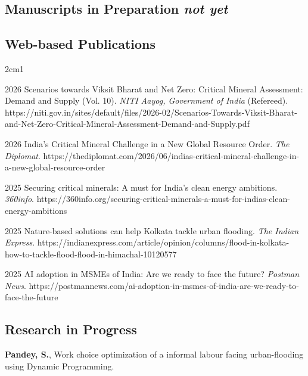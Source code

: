 \documentclass[final, 12pt]{article}
\begin{document}
\subsection*{Manuscripts in Preparation \it not yet}




\subsection*{Web-based Publications}

\begin{hangparas}{2cm}{1}

2026 \tabto{2cm} Scenarios towards Viksit Bharat and Net Zero: Critical Mineral Assessment: Demand and Supply (Vol. 10). {\it NITI Aayog, Government of India} (Refereed). https://niti.gov.in/sites/default/files/2026-02/Scenarios-Towards-Viksit-Bharat-and-Net-Zero-Critical-Mineral-Assessment-Demand-and-Supply.pdf 

2026 \tabto{2cm} India’s Critical Mineral Challenge in a New Global Resource Order. {\it The Diplomat}. https://thediplomat.com/2026/06/indias-critical-mineral-challenge-in-a-new-global-resource-order

2025 \tabto{2cm} Securing critical minerals: A must for India’s clean energy ambitions. {\it 360info}. https://360info.org/securing-critical-minerals-a-must-for-indias-clean-energy-ambitions

2025 \tabto{2cm} Nature-based solutions can help Kolkata tackle urban flooding. {\it The Indian Express}. https://indianexpress.com/article/opinion/columns/flood-in-kolkata-how-to-tackle-flood-flood-in-himachal-10120577 

2025 \tabto{2cm} AI adoption in MSMEs of India: Are we ready to face the future? {\it Postman News}. https://postmannews.com/ai-adoption-in-msmes-of-india-are-we-ready-to-face-the-future\\
\end{hangparas}

\subsection*{Research in Progress}

{\bf Pandey, S.}, Work choice optimization of a informal labour facing urban-flooding using Dynamic Programming.
\end{document}

